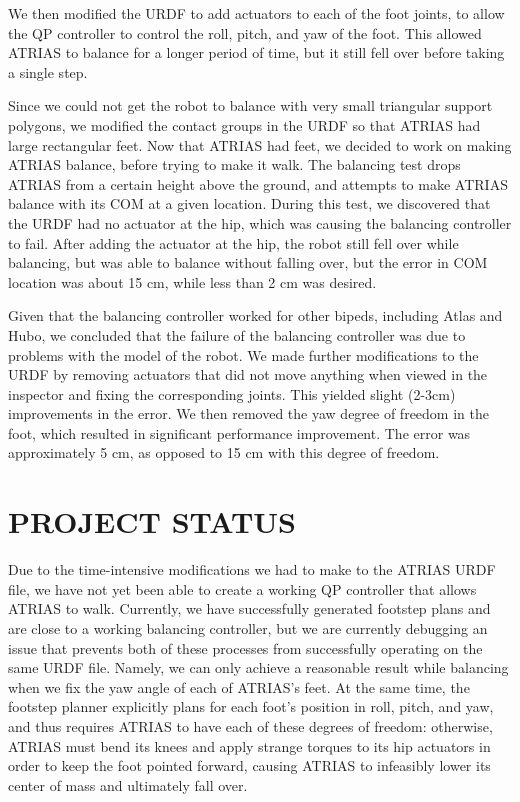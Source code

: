 \documentclass[letterpaper, 10 pt, conference]{ieeeconf}  %
\begin{document}
We then modified the URDF to add actuators to each of the foot joints, to allow the QP controller to control the roll, pitch, and yaw of the foot. This allowed ATRIAS to balance for a longer period of time, but it still fell over before taking a single step. 

Since we could not get the robot to balance with very small triangular support polygons, we modified the contact groups in the URDF so that ATRIAS had large rectangular feet. Now that ATRIAS had feet, we decided to work on making ATRIAS balance, before trying to make it walk. The balancing test drops ATRIAS from a certain height above the ground, and attempts to make ATRIAS balance with its COM at a given location. During this test, we discovered that the URDF had no actuator at the hip, which was causing the balancing controller to fail. After adding the actuator at the hip, the robot still fell over while balancing, but was able to balance without falling over, but the error in COM location was about 15 cm, while less than 2 cm was desired. 

Given that the balancing controller worked for other bipeds, including Atlas and Hubo, we concluded that the failure of the balancing controller was due to problems with the model of the robot. We made further modifications to the URDF by removing actuators that did not move anything when viewed in the inspector and fixing the corresponding joints. This yielded slight (2-3cm) improvements in the error. We then removed the yaw degree of freedom in the foot, which resulted in significant performance improvement. The error was approximately 5 cm, as opposed to 15 cm with this degree of freedom.

\section{PROJECT STATUS}

Due to the time-intensive modifications we had to make to the ATRIAS URDF file, we have not yet been able to create a working QP controller that allows ATRIAS to walk. Currently, we have successfully generated footstep plans and are close to a working balancing controller, but we are currently debugging an issue that prevents both of these processes from successfully operating on the same URDF file. Namely, we can only achieve a reasonable result while balancing when we fix the yaw angle of each of ATRIAS’s feet. At the same time, the footstep planner explicitly plans for each foot’s position in roll, pitch, and yaw, and thus requires ATRIAS to have each of these degrees of freedom: otherwise, ATRIAS must bend its knees and apply strange torques to its hip actuators in order to keep the foot pointed forward, causing ATRIAS to infeasibly lower its center of mass and ultimately fall over.
\end{document}
